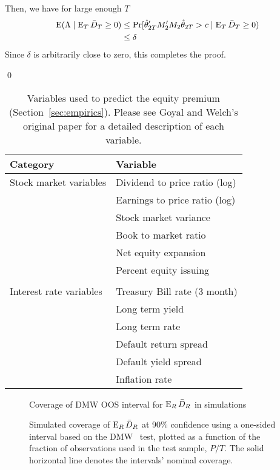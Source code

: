 \documentclass[12pt]{article}
\begin{document}
Then, we have for large enough $T$
\begin{align*}
  \operatorname{E}(\Lambda \mid \operatorname{E}_T \bar{D}_{T} \geq 0) &\leq
  \Pr[\hat\theta_{2T}'M_2'M_2\hat\theta_{2T} > c \mid \operatorname{E}_T \bar{D}_{T} \geq 0) \\
  &\leq \delta
\end{align*}
Since $\delta$ is arbitrarily close to zero, this completes the proof.

\qed



\clearpage

\begin{table}[tb]
  \begin{tabularx}{\linewidth}{XX}
    \toprule
    Category & Variable \\
    \midrule
    Stock market variables
    & Dividend to price ratio (log) \\
    & Earnings to price ratio (log) \\
    & Stock market variance \\
    & Book to market ratio \\
    & Net equity expansion \\
    & Percent equity issuing \\\\
    Interest rate variables
    & Treasury Bill rate (3 month) \\
    & Long term yield \\
    & Long term rate \\
    & Default return spread \\
    & Default yield spread \\
    & Inflation rate \\
    \bottomrule
  \end{tabularx}
  \caption{Variables used to predict the equity premium
    (Section~\ref{sec:empirics}).
    Please see Goyal and Welch's original paper \citep{GoW:08}
    for a detailed description of each variable.}
  \label{tab:equity}
\end{table}

\insamplecoefs
\insampletests


\begin{figure}\centering
  {\large Coverage of DMW OOS interval for $\operatorname{E}_R\bar{D}_{R}$ in simulations}
  \caption{Simulated coverage of $\operatorname{E}_R \bar{D}_{R}$ at 90\% confidence using
    a one-sided interval based on the DMW \oost\ test, plotted as a
    function of the fraction of observations used in the test sample,
    $P/T$. The solid horizontal line denotes the intervals' nominal
    coverage.}
 \label{fig:interval-R}
\end{figure}
\clearpage
\end{document}
